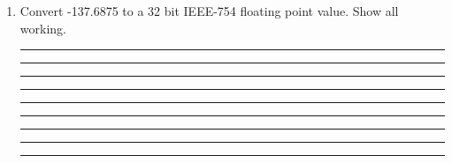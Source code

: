 \documentclass[a4paper,10pt]{article}
\begin{document}
\begin{enumerate}

\item Convert -137.6875 to a 32 bit IEEE-754 floating point value. Show
all working.
\vspace{3mm}\hrule\vspace{7mm}\hrule\vspace{7mm}\hrule\vspace{7mm}\hrule\vspace{7mm}
\hrule\vspace{7mm}\hrule\vspace{7mm}\hrule\vspace{7mm}\hrule\vspace{7mm}
\hrule\vspace{3mm}

\newpage 


\end{enumerate}
\end{document}
